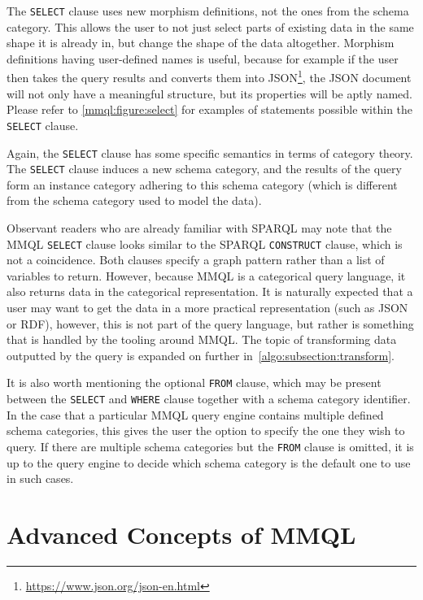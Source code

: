 The \texttt{SELECT} clause uses new morphism definitions, not the ones from the schema category.
This allows the user to not just select parts of existing data in the same shape it is already in, but change the shape of the data altogether.
Morphism definitions having user-defined names is useful, because for example if the user then takes the query results and converts them into JSON\footnote{\url{https://www.json.org/json-en.html}}, the JSON document will not only have a meaningful structure, but its properties will be aptly named.
Please refer to \cref{mmql:figure:select} for examples of statements possible within the \texttt{SELECT} clause.

Again, the \texttt{SELECT} clause has some specific semantics in terms of category theory.
The \texttt{SELECT} clause induces a new schema category, and the results of the query form an instance category adhering to this schema category (which is different from the schema category used to model the data).

Observant readers who are already familiar with SPARQL may note that the MMQL \texttt{SELECT} clause looks similar to the SPARQL \texttt{CONSTRUCT} clause, which is not a coincidence.
Both clauses specify a graph pattern rather than a list of variables to return.
However, because MMQL is a categorical query language, it also returns data in the categorical representation.
It is naturally expected that a user may want to get the data in a more practical representation (such as JSON or RDF), however, this is not part of the query language, but rather is something that is handled by the tooling around MMQL.
The topic of transforming data outputted by the query is expanded on further in~\cref{algo:subsection:transform}.

It is also worth mentioning the optional \texttt{FROM} clause, which may be present between the \texttt{SELECT} and \texttt{WHERE} clause together with a schema category identifier.
In the case that a particular MMQL query engine contains multiple defined schema categories, this gives the user the option to specify the one they wish to query.
If there are multiple schema categories but the \texttt{FROM} clause is omitted, it is up to the query engine to decide which schema category is the default one to use in such cases.

\section{Advanced Concepts of MMQL}

